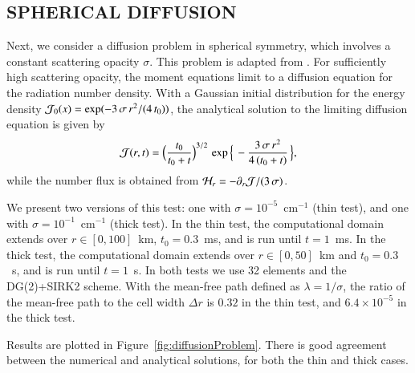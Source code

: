 \documentclass[11pt,letterpaper,twoside,english,final]{article}
\begin{document}
\subsection{SPHERICAL DIFFUSION}

Next, we consider a diffusion problem in spherical symmetry, which involves a constant scattering opacity $\sigma$.  
This problem is adapted from \citet{abdikamalov_etal_2012} \citep[see also][]{pons_etal_2000,sumiyoshiYamada_2012}.  
For sufficiently high scattering opacity, the moment equations limit to a diffusion equation for the radiation number density.  
With a Gaussian initial distribution for the energy density $\mathcal{J}_{0}(x)=\exp(-3\,\sigma\,r^{2}/(4\,t_{0}))$, the analytical solution to the limiting diffusion equation is given by
\begin{equation}
  \mathcal{J}(r,t)=\Big(\frac{t_{0}}{t_{0}+t}\Big)^{3/2}\,\exp\Big\{\,-\frac{3\,\sigma\,r^{2}}{4\,(t_{0}+t)}\,\Big\},
\end{equation}
while the number flux is obtained from $\mathcal{H}_{r}=-\partial_{r}{\mathcal{J}}/(3\,\sigma)$.  

We present two versions of this test:  one with $\sigma=10^{-5}$~cm$^{-1}$ (thin test), and one with $\sigma=10^{-1}$~cm$^{-1}$ (thick test).  
In the thin test, the computational domain extends over $r\in[0,100]$~km, $t_{0}=0.3$~ms, and is run until $t=1$~ms.  
In the thick test, the computational domain extends over $r\in[0,50]$~km and $t_{0}=0.3$~s, and is run until $t=1$~s.  
In both tests we use 32 elements and the DG(2)+SIRK2 scheme.  
With the mean-free path defined as $\lambda=1/\sigma$, the ratio of the mean-free path to the cell width $\Delta r$ is $0.32$ in the thin test, and $6.4\times10^{-5}$ in the thick test.  

Results are plotted in Figure~\ref{fig:diffusionProblem}.  
There is good agreement between the numerical and analytical solutions, for both the thin and thick cases.  
\end{document}
